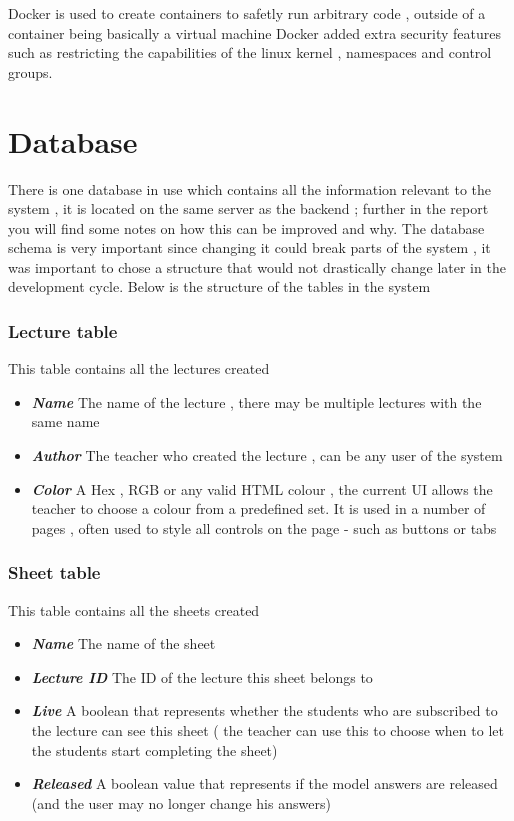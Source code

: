 Docker is used to create containers to safetly run arbitrary code , outside of a container being basically a virtual machine Docker added extra security features \cite{dockersecurity} such as restricting the capabilities of the linux kernel , namespaces and control groups.



\section{Database}
There is one database in use which contains all the information relevant to the system , it is located on the same server as the backend ; further in the report you will find some notes on how this can be improved and why.
The database schema is very important since changing it could break parts of the system , it was important to chose a structure that would not drastically change later in the development cycle.
Below is the structure of the tables in the system

\subsubsection{Lecture table}
This table contains all the lectures created

\begin{itemize}
	\item \textit{\textbf{Name}} The name of the lecture , there may be multiple lectures with the same name
	\item  \textit{\textbf{Author}} The teacher who created the lecture , can be any user of the system
	\item  \textit{\textbf{Color}} A Hex , RGB or any valid HTML colour , the current UI allows the teacher to choose a colour from a predefined set. It is used in a number of pages , often used to style all controls on the page - such as buttons or tabs	
\end{itemize}

\subsubsection{Sheet table}
This table contains all the sheets created

\begin{itemize}
	\item  \textit{\textbf{Name}} The name of the sheet
	\item  \textit{\textbf{Lecture ID}} The ID of the lecture this sheet belongs to
	\item  \textit{\textbf{Live}} A boolean that represents whether the students who are subscribed to the lecture can see this sheet ( the teacher can use this to choose when to let the students start completing the sheet)
	\item  \textit{\textbf{Released}} A boolean value that represents if the model answers are released (and the user may no longer change his answers)
\end{itemize}


